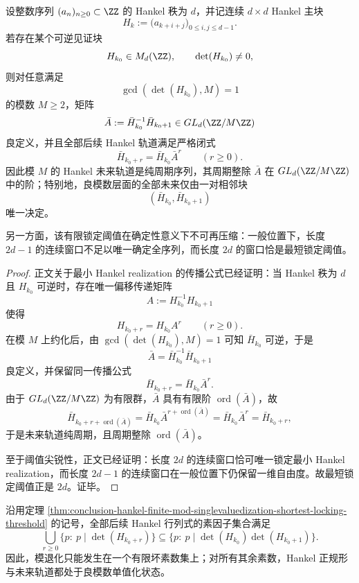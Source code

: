 \begin{theorem}\label{thm:conclusion-hankel-finite-mod-singlevaluedization-shortest-locking-threshold}
设整数序列 \((a_n)_{n\ge 0}\subset \ZZ\) 的 Hankel 秩为 \(d\)，并记连续 \(d\times d\) Hankel 主块
\[
H_k:=\bigl(a_{k+i+j}\bigr)_{0\le i,j\le d-1}.
\]
若存在某个可逆见证块
\[
H_{k_0}\in M_d(\ZZ),
\qquad
\det(H_{k_0})\neq 0,
\]
则对任意满足
\[
\gcd(\det(H_{k_0}),M)=1
\]
的模数 \(M\ge 2\)，矩阵
\[
\bar A:=\bar H_{k_0}^{-1}\bar H_{k_0+1}\in GL_d(\ZZ/M\ZZ)
\]
良定义，并且全部后续 Hankel 轨道满足严格闭式
\[
\bar H_{k_0+r}=\bar H_{k_0}\bar A^r
\qquad (r\ge 0).
\]
因此模 \(M\) 的 Hankel 未来轨道是纯周期序列，其周期整除 \(\bar A\) 在 \(GL_d(\ZZ/M\ZZ)\) 中的阶；特别地，良模数层面的全部未来仅由一对相邻块
\[
(\bar H_{k_0},\bar H_{k_0+1})
\]
唯一决定。

另一方面，该有限锁定阈值在确定性意义下不可再压缩：一般位置下，长度 \(2d-1\) 的连续窗口不足以唯一确定全序列，而长度 \(2d\) 的窗口恰是最短锁定阈值。
\end{theorem}

\begin{proof}
正文关于最小 Hankel realization 的传播公式已经证明：当 Hankel 秩为 \(d\) 且 \(H_{k_0}\) 可逆时，存在唯一偏移传递矩阵
\[
A:=H_{k_0}^{-1}H_{k_0+1}
\]
使得
\[
H_{k_0+r}=H_{k_0}A^r
\qquad (r\ge 0).
\]
在模 \(M\) 上约化后，由 \(\gcd(\det(H_{k_0}),M)=1\) 可知 \(\bar H_{k_0}\) 可逆，于是
\[
\bar A=\bar H_{k_0}^{-1}\bar H_{k_0+1}
\]
良定义，并保留同一传播公式
\[
\bar H_{k_0+r}=\bar H_{k_0}\bar A^r.
\]
由于 \(GL_d(\ZZ/M\ZZ)\) 为有限群，\(\bar A\) 具有有限阶 \(\operatorname{ord}(\bar A)\)，故
\[
\bar H_{k_0+r+\operatorname{ord}(\bar A)}
=
\bar H_{k_0}\bar A^{r+\operatorname{ord}(\bar A)}
=
\bar H_{k_0}\bar A^r
=
\bar H_{k_0+r},
\]
于是未来轨道纯周期，且周期整除 \(\operatorname{ord}(\bar A)\)。

至于阈值尖锐性，正文已经证明：长度 \(2d\) 的连续窗口恰可唯一锁定最小 Hankel realization，而长度 \(2d-1\) 的连续窗口在一般位置下仍保留一维自由度。故最短锁定阈值正是 \(2d\)。证毕。
\end{proof}

\begin{corollary}\label{cor:conclusion-hankel-mod-degeneration-finite-bad-prime-localization}
沿用定理 \ref{thm:conclusion-hankel-finite-mod-singlevaluedization-shortest-locking-threshold} 的记号，全部后续 Hankel 行列式的素因子集合满足
\[
\bigcup_{r\ge 0}\{p:\ p\mid \det(H_{k_0+r})\}
\subseteq
\{p:\ p\mid \det(H_{k_0})\det(H_{k_0+1})\}.
\]
因此，模退化只能发生在一个有限坏素数集上；对所有其余素数，Hankel 正规形与未来轨道都处于良模数单值化状态。
\end{corollary}

